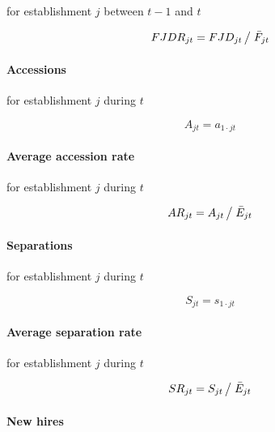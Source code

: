 for establishment $j$ between $t-1$ and $t$

\begin{equation}
FJDR_{jt} = F{JD_{jt} } \left/ {\vphantom {{JD_{jt} } {\bar {F}_{jt} }}}
\right. {\bar {F}_{jt} }
\end{equation}

\paragraph{Accessions}

for establishment $j$ during $t$

\begin{equation}
A_{jt} = a_{1\cdot jt}
\end{equation}

\paragraph{Average accession rate}

for establishment $j$ during $t$

\begin{equation}
AR_{jt} = {A_{jt} } \left/ {\vphantom {{A_{jt} } {\bar {E}_{jt} }}} \right. {%
\bar{E}_{jt} }
\end{equation}

\paragraph{Separations}

for establishment $j$ during $t$

\begin{equation}
S_{jt} = s_{1\cdot jt}
\end{equation}

\paragraph{Average separation rate}

for establishment $j$ during $t$

\begin{equation}
SR_{jt} = {S_{jt} } \left/ {\vphantom {{S_{jt} } {\bar {E}_{jt} }}} \right. {%
\bar{E}_{jt} }
\end{equation}

\paragraph{New hires}

